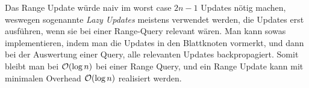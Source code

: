 Das Range Update würde naiv im worst case \(2n-1\) Updates nötig machen, weswegen sogenannte \emph{Lazy Updates} meistens verwendet werden, die Updates erst ausführen, wenn sie bei einer Range-Query relevant wären.
Man kann sowas implementieren, indem man die Updates in den Blattknoten vormerkt, und dann bei der Auswertung einer Query, alle relevanten Updates backpropagiert.
Somit bleibt man bei \(\mathcal O(\log n)\) bei einer Range Query, und ein Range Update kann mit minimalen Overhead \(\mathcal O(\log n)\) realisiert werden.
